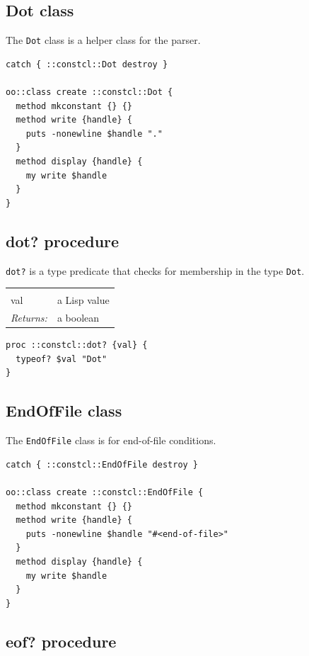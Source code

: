 \documentclass[twoside,9pt]{report}
\begin{document}
\subsection{Dot class}
\label{dot-class}


The \texttt{Dot} class is a helper class for the parser.

\begin{lstlisting}
catch { ::constcl::Dot destroy }
 
oo::class create ::constcl::Dot {
  method mkconstant {} {}
  method write {handle} {
    puts -nonewline $handle "."
  }
  method display {handle} {
    my write $handle
  }
}
\end{lstlisting}
\subsection{dot? procedure}
\label{dot?-procedure}


\texttt{dot?} is a type predicate that checks for membership in the type \texttt{Dot}.

\noindent\begin{tabular}{ |p{1.5cm} p{8cm}| }
\hline
\rowcolor[HTML]{CCCCCC} \multicolumn{2}{|l|}{\bf dot? (internal)} \\
val & a Lisp value \\
\textit{Returns:} & a boolean \\
\hline
\end{tabular}
\begin{lstlisting}
proc ::constcl::dot? {val} {
  typeof? $val "Dot"
}
\end{lstlisting}
\subsection{EndOfFile class}
\label{endoffile-class}


The \texttt{EndOfFile} class is for end-of-file conditions.

\begin{lstlisting}
catch { ::constcl::EndOfFile destroy }
 
oo::class create ::constcl::EndOfFile {
  method mkconstant {} {}
  method write {handle} {
    puts -nonewline $handle "#<end-of-file>"
  }
  method display {handle} {
    my write $handle
  }
}
\end{lstlisting}
\subsection{eof? procedure}
\label{eof?-procedure}
\end{document}
